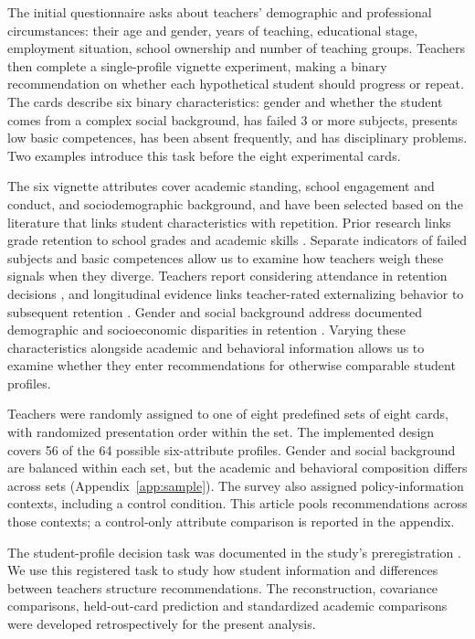 The initial questionnaire asks about teachers' demographic and professional circumstances: their age and gender, years of teaching, educational stage, employment situation, school ownership and number of teaching groups. Teachers then complete a single-profile vignette experiment, making a binary recommendation on whether each hypothetical student should progress or repeat. The cards describe six binary characteristics: gender and whether the student comes from a complex social background, has failed 3 or more subjects, presents low basic competences, has been absent frequently, and has disciplinary problems. Two examples introduce this task before the eight experimental cards.

The six vignette attributes cover academic standing, school engagement and conduct, and sociodemographic background, and have been selected based on the literature that links student characteristics with repetition. Prior research links grade retention to school grades \citep{klapprothschaltz2015retained} and academic skills \citep{davoudzadeh2015readiness}. Separate indicators of failed subjects and basic competences allow us to examine how teachers weigh these signals when they diverge. Teachers report considering attendance in retention decisions \citep{santosmonteiro2024retention}, and longitudinal evidence links teacher-rated externalizing behavior to subsequent retention \citep{mattison2018behavior}. Gender and social background address documented demographic and socioeconomic disparities in retention \citep{gonzalezbetancor2016retention,klapprothschaltz2015retained}. Varying these characteristics alongside academic and behavioral information allows us to examine whether they enter recommendations for otherwise comparable student profiles.

Teachers were randomly assigned to one of eight predefined sets of eight cards, with randomized presentation order within the set. The implemented design covers 56 of the 64 possible six-attribute profiles. Gender and social background are balanced within each set, but the academic and behavioral composition differs across sets (Appendix~\ref{app:sample}). The survey also assigned policy-information contexts, including a control condition. This article pools recommendations across those contexts; a control-only attribute comparison is reported in the appendix.

The student-profile decision task was documented in the study's preregistration \citep{registry}. We use this registered task to study how student information and differences between teachers structure recommendations. The reconstruction, covariance comparisons, held-out-card prediction and standardized academic comparisons were developed retrospectively for the present analysis.

